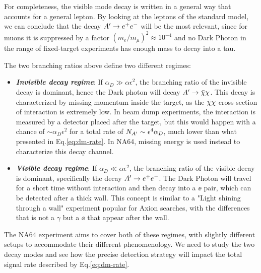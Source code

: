 For completeness, the visible mode decay is written in a general way that accounts for a general lepton. By looking at the leptons of the standard model, we can conclude that the decay $A' \to e^+e^-$ will be the most relevant, since for muons it is suppressed by a factor $(m_e/m_{\mu})^2 \approx 10^{-4}$ and no Dark Photon in the range of fixed-target experiments has enough mass to decay into a tau.

The two branching ratios above define two different regimes:
\begin{itemize}
\item \textbf{\textit{Invisible decay regime}}: If $\alpha_D \gg \alpha \epsilon^2$, the branching ratio of the invisible decay is dominant, hence the Dark photon will decay $A' \to \bar{\chi} \chi$. This decay is characterized by missing momentum inside the target, as the $\bar{\chi} \chi$ cross-section of interaction is extremely low. In beam dump experiments, the interaction is measured by a detector placed after the target, but this would happen with a chance of $\sim \alpha_D \epsilon^2$ for a total rate of $N_{A'} \sim \epsilon^4 \alpha_D$, much lower than what presented in Eq.\ref{eq:dm-rate}. In NA64, missing energy is used instead to characterize this decay channel. 
\item \textbf{\textit{Visible decay regime}}: If $\alpha_D \ll \alpha \epsilon^2$, the branching ratio of the visible decay is dominant, specifically the decay $A' \to e^+e^-$. The Dark Photon will travel for a short time without interaction and then decay into a $\ee$ pair, which can be detected after a thick wall. This concept is similar to a "Light shining through a wall" experiment popular for Axion searches, with the differences that is not a $\gamma$ but a $\ee$ that appear after the wall.
\end{itemize}

The NA64 experiment aims to cover both of these regimes, with slightly different setups to accommodate their different phenomenology. We need to study the two decay modes and see how the precise detection strategy will impact the total signal rate described by Eq.\ref{eq:dm-rate}.

